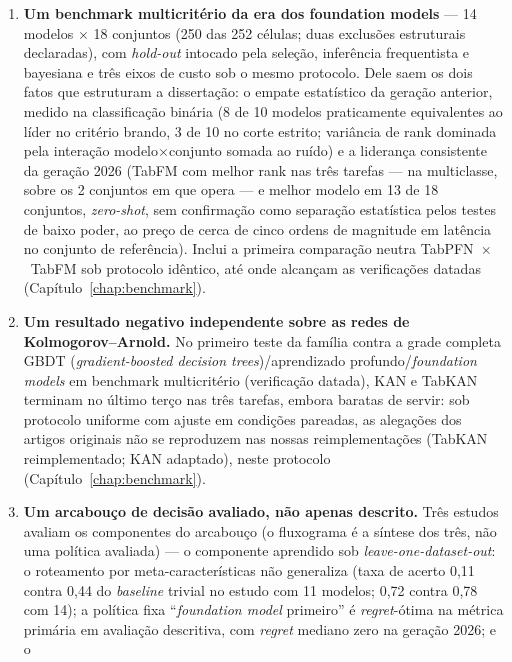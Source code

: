 \begin{enumerate}
  \item \textbf{Um benchmark multicritério da era dos foundation models}
    --- 14 modelos $\times$ 18 conjuntos (250 das 252 células; duas
    exclusões estruturais declaradas), com \emph{hold-out} intocado
    pela seleção,
    inferência frequentista e bayesiana e três eixos de custo sob o mesmo
    protocolo. Dele saem os dois fatos que estruturam a dissertação: o
    empate estatístico da geração anterior, medido na classificação
    binária (8 de 10 modelos
    praticamente equivalentes ao líder no critério brando, 3 de 10 no
    corte estrito; variância de rank
    dominada pela interação modelo$\times$conjunto somada ao ruído) e a
    liderança consistente da geração 2026 (TabFM com melhor rank nas
    três tarefas --- na multiclasse, sobre os 2 conjuntos em que
    opera --- e
    melhor modelo em 13 de 18 conjuntos, \emph{zero-shot}, sem
    confirmação como separação estatística pelos testes de baixo poder,
    ao preço de
    cerca de cinco ordens de magnitude em latência no conjunto de
    referência). Inclui a primeira
    comparação neutra TabPFN~$\times$~TabFM sob protocolo idêntico, até
    onde alcançam as verificações datadas (Capítulo~\ref{chap:benchmark}).
  \item \textbf{Um resultado negativo independente sobre as redes de
    Kolmogorov--Arnold.} No primeiro teste da família contra a grade
    completa GBDT (\emph{gradient-boosted decision trees})/aprendizado
    profundo/\emph{foundation models} em
    benchmark multicritério (verificação datada), KAN e TabKAN terminam no
    último terço nas três tarefas, embora baratas de servir: sob protocolo
    uniforme com ajuste em condições pareadas, as alegações dos
    artigos originais não se reproduzem nas nossas reimplementações
    (TabKAN reimplementado; KAN adaptado), neste protocolo
    (Capítulo~\ref{chap:benchmark}).
  \item \textbf{Um arcabouço de decisão avaliado, não
    apenas descrito.}
    Três estudos avaliam os componentes do arcabouço (o fluxograma é a
    síntese dos três, não uma política avaliada) --- o componente
    aprendido sob \emph{leave-one-dataset-out}: o roteamento por
    meta-características
    não generaliza (taxa de acerto 0,11 contra 0,44 do \emph{baseline}
    trivial no estudo com 11 modelos; 0,72 contra 0,78 com 14); a política
    fixa ``\emph{foundation model} primeiro'' é \emph{regret}-ótima na
    métrica primária em avaliação descritiva, com \emph{regret} mediano
    zero na geração 2026; e o

\end{enumerate}
